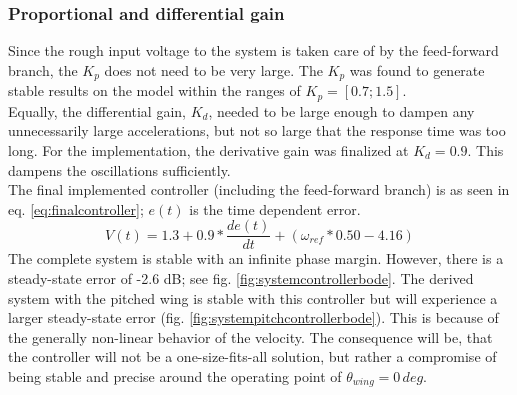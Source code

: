 \subsubsection{Proportional and differential gain}
Since the rough input voltage to the system is taken care of by the feed-forward branch, the $K_p$ does not need to be very large. The $K_p$ was found to generate stable results on the model within the ranges of $K_p = [0.7;1.5]$.\\
Equally, the differential gain, $K_d$, needed to be large enough to dampen any unnecessarily large accelerations, but not so large that the response time was too long. For the implementation, the derivative gain was finalized at $K_d = 0.9$. This dampens the oscillations sufficiently.\\
The final implemented controller (including the feed-forward branch) is as seen in eq. \ref{eq:finalcontroller}; $e(t)$ is the time dependent error.
\begin{equation}
    \label{eq:finalcontroller}
    V(t) = 1.3 + 0.9*\frac{de(t)}{dt}+(\omega_{ref}*0.50-4.16)
\end{equation}
The complete system is stable with an infinite phase margin. However, there is a steady-state error of -2.6 dB; see fig. \ref{fig:systemcontrollerbode}. The derived system with the pitched wing is stable with this controller but will experience a larger steady-state error (fig. \ref{fig:systempitchcontrollerbode}). This is because of the generally non-linear behavior of the velocity. The consequence will be, that the controller will not be a one-size-fits-all solution, but rather a compromise of being stable and precise around the operating point of $\theta_{wing} = 0 \,deg$. \\

